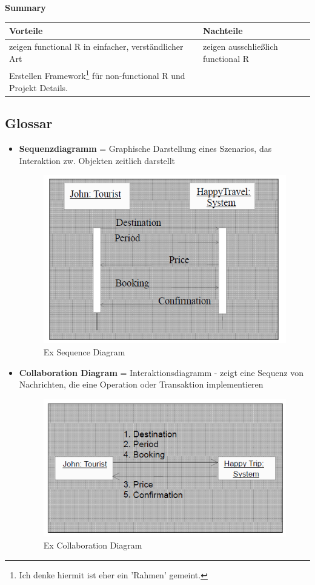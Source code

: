 \textbf{Summary}\\
\begin{table}[!h]
	\begin{tabular}{p{20em}|p{20em}}
		Vorteile & Nachteile\\
		\hline
		zeigen functional R in einfacher, verständlicher Art & zeigen ausschließlich functional R\\
		Erstellen Framework\footnote{Ich denke hiermit ist eher ein 'Rahmen' gemeint.} für non-functional R und Projekt Details. & 
	\end{tabular}
\end{table}

\subsection{Glossar}
\begin{itemize}
	\item \textbf{Sequenzdiagramm} = Graphische Darstellung eines Szenarios, das Interaktion zw. Objekten zeitlich darstellt
	\begin{figure}[!h]
		\centering
		\includegraphics[scale=0.5]{img/ex_sequence_diagram.png}
		\caption{Ex Sequence Diagram}
	\end{figure}
	\item \textbf{Collaboration Diagram} = Interaktionsdiagramm - zeigt eine Sequenz von Nachrichten, die eine Operation oder Transaktion implementieren
	\begin{figure}[!h]
		\centering
		\includegraphics[scale=0.5]{img/ex_collaboration_diagram.png}
		\caption{Ex Collaboration Diagram}
	\end{figure}
\end{itemize}

